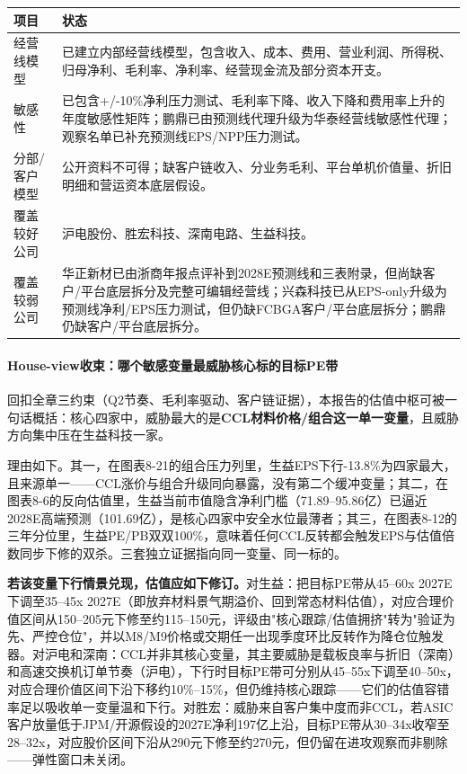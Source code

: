 \begin{exhibitbox}[图表8-23：可编辑经营EPS模型状态]
\small
\begin{tabularx}{\textwidth}{L{3cm}X}
\toprule
\textbf{项目} & \textbf{状态} \\
\midrule
经营线模型 & 已建立内部经营线模型，包含收入、成本、费用、营业利润、所得税、归母净利、毛利率、净利率、经营现金流及部分资本开支。 \\
敏感性 & 已包含+/-10\%净利压力测试、毛利率下降、收入下降和费用率上升的年度敏感性矩阵；鹏鼎已由预测线代理升级为华泰经营线敏感性代理；观察名单已补充预测线EPS/NPP压力测试。 \\
分部/客户模型 & 公开资料不可得；缺客户链收入、分业务毛利、平台单机价值量、折旧明细和营运资本底层假设。 \\
覆盖较好公司 & 沪电股份、胜宏科技、深南电路、生益科技。 \\
覆盖较弱公司 & 华正新材已由浙商年报点评补到2028E预测线和三表附录，但尚缺客户/平台底层拆分及完整可编辑经营线；兴森科技已从EPS-only升级为预测线净利/EPS压力测试，但仍缺FCBGA客户/平台底层拆分；鹏鼎仍缺客户/平台底层拆分。 \\
\bottomrule
\end{tabularx}
\end{exhibitbox}

\paragraph{House-view收束：哪个敏感变量最威胁核心标的目标PE带}
回扣全章三约束（Q2节奏、毛利率驱动、客户链证据），本报告的估值中枢可被一句话概括：核心四家中，威胁最大的是\textbf{CCL材料价格/组合这一单一变量}，且威胁方向集中压在生益科技一家。

理由如下。其一，在图表8-21的组合压力列里，生益EPS下行-13.8\%为四家最大，且来源单一——CCL涨价与组合升级同向暴露，没有第二个缓冲变量；其二，在图表8-6的反向估值里，生益当前市值隐含净利门槛（71.89--95.86亿）已逼近2028E高端预测（101.69亿），是核心四家中安全水位最薄者；其三，在图表8-12的三年分位里，生益PE/PB双双100\%，意味着任何CCL反转都会触发EPS与估值倍数同步下修的双杀。三套独立证据指向同一变量、同一标的。

\textbf{若该变量下行情景兑现，估值应如下修订。}对生益：把目标PE带从45--60x 2027E下调至35--45x 2027E（即放弃材料景气期溢价、回到常态材料估值），对应合理价值区间从150--205元下修至约115--150元，评级由"核心跟踪/估值拥挤"转为"验证为先、严控仓位"，并以M8/M9价格或交期任一出现季度环比反转作为降仓位触发器。对沪电和深南：CCL并非其核心变量，其主要威胁是载板良率与折旧（深南）和高速交换机订单节奏（沪电），下行时目标PE带可分别从45--55x下调至40--50x，对应合理价值区间下沿下移约10\%--15\%，但仍维持核心跟踪——它们的估值容错率足以吸收单一变量温和下行。对胜宏：威胁来自客户集中度而非CCL，若ASIC客户放量低于JPM/开源假设的2027E净利197亿上沿，目标PE带从30--34x收窄至28--32x，对应股价区间下沿从290元下修至约270元，但仍留在进攻观察而非剔除——弹性窗口未关闭。

